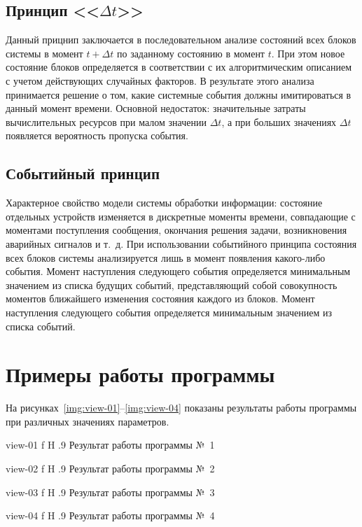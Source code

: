 \documentclass{bmstu}
\begin{document}
\section{Принцип <<$\Delta t$>>}

Данный прицнип заключается в последовательном анализе состояний всех блоков системы в момент $t + \Delta t$ по заданному состоянию в момент $t$. 
При этом новое состояние блоков определяется в соответствии с их алгоритмическим описанием с учетом действующих случайных факторов. 
В результате этого анализа принимается решение о том, какие системные события должны имитироваться в данный момент времени. 
Основной недостаток: значительные затраты вычислительных ресурсов при малом значении $\Delta t$, а при больших значениях $\Delta t$ появляется вероятность пропуска события.

\section{Событийный принцип}

Характерное свойство модели системы обработки информации: состояние отдельных устройств изменяется в дискретные моменты времени, совпадающие с моментами поступления сообщения, окончания решения задачи, возникновения аварийных сигналов и т.~д. 
При использовании событийного принципа состояния всех блоков системы анализируется лишь в момент появления какого-либо события. 
Момент наступления следующего события определяется минимальным значением из списка будущих событий, представляющий собой совокупность моментов ближайшего изменения состояния каждого из блоков. 
Момент наступления следующего события определяется минимальным значением из списка событий.

\chapter{Примеры работы программы}

На рисунках~\ref{img:view-01}--\ref{img:view-04} показаны результаты работы программы при различных значениях параметров.

    {view-01}
    {f}
    {H}
    {.9\textwidth}
    {Результат работы программы №~1}
    
    {view-02}
    {f}
    {H}
    {.9\textwidth}
    {Результат работы программы №~2}
    
    {view-03}
    {f}
    {H}
    {.9\textwidth}
    {Результат работы программы №~3}
    
    {view-04}
    {f}
    {H}
    {.9\textwidth}
    {Результат работы программы №~4}
\end{document}
